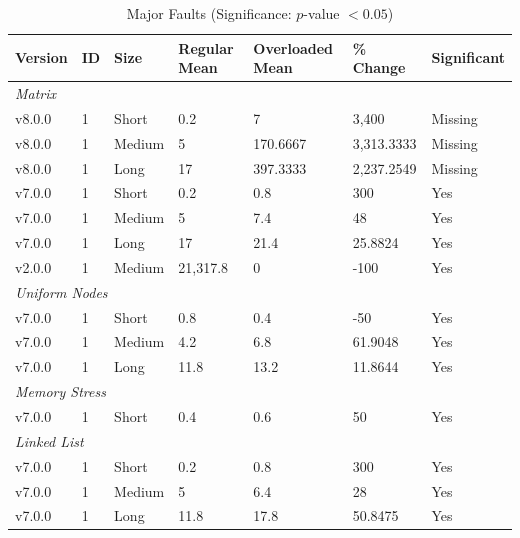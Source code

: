 \begin{table}[H]\caption{Major Faults (Significance: $p$-value $<0.05$)}
\centering\footnotesize\setlength{\tabcolsep}{4pt}\renewcommand{\arraystretch}{1.15}
\begin{tabular}{lllllll}
\toprule
Version & ID & Size & Regular Mean & Overloaded Mean & \% Change & Significant \\ \midrule
\multicolumn{7}{l}{\textit{Matrix}} \\
v8.0.0 & 1 & Short & 0.2 & 7 & 3,400 & Missing \\
v8.0.0 & 1 & Medium & 5 & 170.6667 & 3,313.3333 & Missing \\
v8.0.0 & 1 & Long & 17 & 397.3333 & 2,237.2549 & Missing \\
v7.0.0 & 1 & Short & 0.2 & 0.8 & 300 & Yes \\
v7.0.0 & 1 & Medium & 5 & 7.4 & 48 & Yes \\
v7.0.0 & 1 & Long & 17 & 21.4 & 25.8824 & Yes \\
v2.0.0 & 1 & Medium & 21,317.8 & 0 & -100 & Yes \\
\multicolumn{7}{l}{\textit{Uniform Nodes}} \\
v7.0.0 & 1 & Short & 0.8 & 0.4 & -50 & Yes \\
v7.0.0 & 1 & Medium & 4.2 & 6.8 & 61.9048 & Yes \\
v7.0.0 & 1 & Long & 11.8 & 13.2 & 11.8644 & Yes \\
\multicolumn{7}{l}{\textit{Memory Stress}} \\
v7.0.0 & 1 & Short & 0.4 & 0.6 & 50 & Yes \\
\multicolumn{7}{l}{\textit{Linked List}} \\
v7.0.0 & 1 & Short & 0.2 & 0.8 & 300 & Yes \\
v7.0.0 & 1 & Medium & 5 & 6.4 & 28 & Yes \\
v7.0.0 & 1 & Long & 11.8 & 17.8 & 50.8475 & Yes \\
\bottomrule\end{tabular}
\label{MajorFaultsMetrics}
\par\smallskip\parbox{0.95\textwidth}{\scriptsize}
\end{table}

